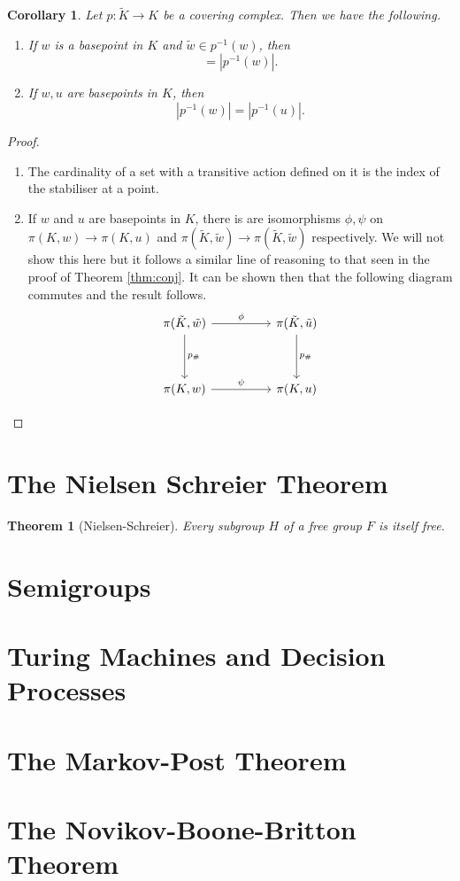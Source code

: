 \documentclass[12pt]{article}
\newtheorem{theorem}{Theorem}
\newtheorem{corollary}{Corollary}[theorem]
\theoremstyle{definition}
\numberwithin{equation}{theorem}
\begin{document}
\begin{corollary}
  Let $p: \tilde{K} \rightarrow K$ be a covering complex. Then we have the following.
  \begin{enumerate}
  \item If $w$ is a basepoint in $K$ and $\tilde{w} \in p^{-1}(w)$, then
    \begin{equation*}
      [\pi(K,w) : p_{\#}\pi(\tilde{K},\tilde{w})] = |p^{-1}(w)|.
    \end{equation*}
  \item If $w,u$ are basepoints in $K$, then
    \begin{equation*}
      |p^{-1}(w)| = |p^{-1}(u)|.
    \end{equation*}
  \end{enumerate}
\end{corollary}

\begin{proof}
  \begin{enumerate}
  \item The cardinality of a set with a transitive action defined on it is the index of the stabiliser at a point.
  \item If $w$ and $u$ are basepoints in $K$, there is are isomorphisms $\phi,\psi$ on $\pi(K,w)\rightarrow\pi(K,u)$ and $\pi(\tilde{K},\tilde{w})\rightarrow\pi(\tilde{K},\tilde{w})$ respectively. We will not show this here but it follows a similar line of reasoning to that seen in the proof of Theorem \ref{thm:conj}. It can be shown then that the following diagram commutes and the result follows.
    \begin{equation*}
      \begin{tikzcd}[ampersand replacement=\&, sep=huge]
        \pi(\tilde{K},\tilde{w})\arrow[r,"\phi"]\arrow[d,"p_{\#}"]\& \pi(\tilde{K},\tilde{u}) \arrow[d,"p_{\#}"] \\
        \pi(K,w) \arrow[r,"\psi"] \& \pi(K,u)
      \end{tikzcd}
    \end{equation*}
  \end{enumerate}
\end{proof}


\section{The Nielsen Schreier Theorem}
\begin{theorem}[Nielsen-Schreier]\label{thm:ns}
  Every subgroup $H$ of a free group $F$ is itself free.
\end{theorem}
\section{Semigroups}
\section{Turing Machines and Decision Processes}
\section{The Markov-Post Theorem}
\section{The Novikov-Boone-Britton Theorem}
\nocite{rotman1999introduction}



\end{document}
